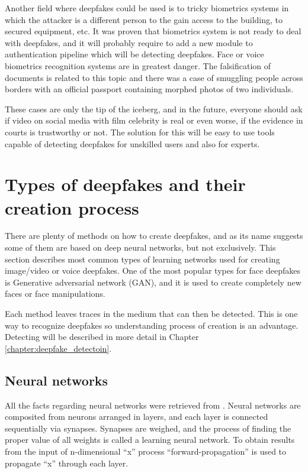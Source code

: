 Another field where deepfakes could be used is to tricky biometrics systems in which the attacker is a different person to the gain access to the building, to secured equipment, etc. It was proven that biometrics system is not ready to deal with deepfakes, and it will probably require to add a new module to authentication pipeline which will be detecting deepfakes. Face or voice biometrics recognition systems are in greatest danger. The falsification of documents is related to this topic and there was a case of smuggling people across borders with an official passport containing morphed photos of two individuals.

These cases are only the tip of the iceberg, and in the future, everyone should ask if video on social media with film celebrity is real or even worse, if the evidence in courts is trustworthy or not. The solution for this will be easy to use tools capable of detecting deepfakes for unskilled users and also for experts.

\section{Types of deepfakes and their creation process}
\label{section:deepfakes_creation}

There are plenty of methods on how to create deepfakes, and as its name suggests some of them are based on deep neural networks, but not exclusively.  This section describes most common types of learning networks used for creating image/video or voice deepfakes. One of the most popular types for face deepfakes is Generative adversarial network (GAN), and it is used to create completely new faces or face manipulations.

Each method leaves traces in the medium that can then be detected. This is one way to recognize deepfakes so understanding process of creation is an advantage. Detecting will be described in more detail in Chapter \ref{chapter:deepfake_detectoin}.

\subsection{Neural networks}

All the facts regarding neural networks were retrieved from \cite{CreationandDetectionofDeepfakes}. Neural networks are composited from neurons arranged in layers, and each layer is connected sequentially via synapses. Synapses are weighed, and the process of finding the proper value of all weights is called a learning neural network. To obtain results from the input of n-dimensional “x” process “forward-propagation” is used to propagate “x” through each layer.

